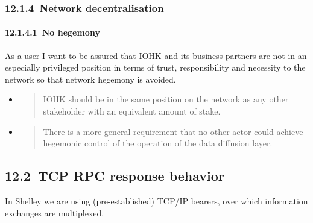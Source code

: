 \documentclass[11pt,a4paper]{article}
\begin{document}
\hypertarget{network-decentralisation}{%
\subsubsection{​12.1.4​~Network
decentralisation}\label{network-decentralisation}}

\hypertarget{no-hegemony}{%
\paragraph{​12.1.4.1​~No hegemony}\label{no-hegemony}}

As a user I want to be assured that IOHK and its business partners are
not in an especially privileged position in terms of trust,
responsibility and necessity to the network so that network hegemony is
avoided.

\begin{itemize}
\item
  \begin{quote}
  IOHK should be in the same position on the network as any other
  stakeholder with an equivalent amount of stake.
  \end{quote}
\item
  \begin{quote}
  There is a more general requirement that no other actor could achieve
  hegemonic control of the operation of the data diffusion layer.
  \end{quote}
\end{itemize}

\hypertarget{tcp-rpc-response-behavior}{%
\subsection{​12.2​~TCP RPC response
behavior}\label{tcp-rpc-response-behavior}}

In Shelley we are using (pre-established) TCP/IP bearers, over which
information exchanges are multiplexed.
\end{document}
